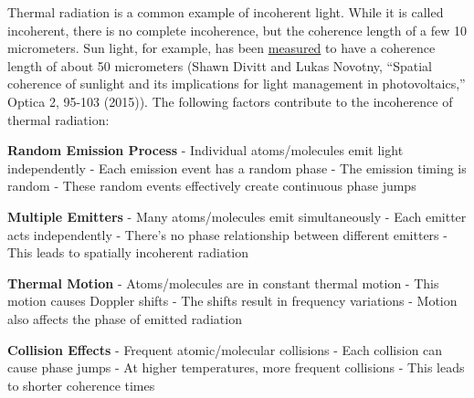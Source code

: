 \documentclass[
  a4paper,
]{book}
\begin{document}
\begin{tcolorbox}[enhanced jigsaw, breakable, toptitle=1mm, bottomrule=.15mm, colbacktitle=quarto-callout-note-color!10!white, title=\textcolor{quarto-callout-note-color}{\faInfo}\hspace{0.5em}{Coherence of Thermal radiation}, arc=.35mm, rightrule=.15mm, bottomtitle=1mm, opacityback=0, toprule=.15mm, coltitle=black, leftrule=.75mm, opacitybacktitle=0.6, colback=white, left=2mm, titlerule=0mm, colframe=quarto-callout-note-color-frame]

Thermal radiation is a common example of incoherent light. While it is
called incoherent, there is no complete incoherence, but the coherence
length of a few 10 micrometers. Sun light, for example, has been
\href{https://www.semanticscholar.org/paper/Spatial-coherence-of-sunlight-and-its-implications-Divitt-Novotn\%C3\%BD/fbc2560b8fc54a10cb0feeac94eb3607e4e80ffb}{measured}
to have a coherence length of about 50 micrometers (Shawn Divitt and
Lukas Novotny, ``Spatial coherence of sunlight and its implications for
light management in photovoltaics,'' Optica 2, 95-103 (2015)). The
following factors contribute to the incoherence of thermal radiation:

\textbf{Random Emission Process} - Individual atoms/molecules emit light
independently - Each emission event has a random phase - The emission
timing is random - These random events effectively create continuous
phase jumps

\textbf{Multiple Emitters} - Many atoms/molecules emit simultaneously -
Each emitter acts independently - There's no phase relationship between
different emitters - This leads to spatially incoherent radiation

\textbf{Thermal Motion} - Atoms/molecules are in constant thermal motion
- This motion causes Doppler shifts - The shifts result in frequency
variations - Motion also affects the phase of emitted radiation

\textbf{Collision Effects} - Frequent atomic/molecular collisions - Each
collision can cause phase jumps - At higher temperatures, more frequent
collisions - This leads to shorter coherence times

\end{tcolorbox}
\end{document}
